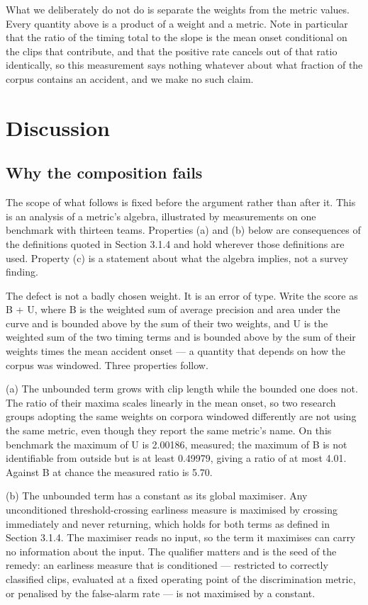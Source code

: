 What we deliberately do not do is separate the weights from the metric values. Every quantity above is a product of a weight and a metric. Note in particular that the ratio of the timing total to the slope is the mean onset conditional on the clips that contribute, and that the positive rate cancels out of that ratio identically, so this measurement says nothing whatever about what fraction of the corpus contains an accident, and we make no such claim.


\section{Discussion}

\subsection{Why the composition fails}

The scope of what follows is fixed before the argument rather than after it. This is an analysis of a metric's algebra, illustrated by measurements on one benchmark with thirteen teams. Properties (a) and (b) below are consequences of the definitions quoted in Section 3.1.4 and hold wherever those definitions are used. Property (c) is a statement about what the algebra implies, not a survey finding.

The defect is not a badly chosen weight. It is an error of type. Write the score as B + U, where B is the weighted sum of average precision and area under the curve and is bounded above by the sum of their two weights, and U is the weighted sum of the two timing terms and is bounded above by the sum of their weights times the mean accident onset --- a quantity that depends on how the corpus was windowed. Three properties follow.

(a) The unbounded term grows with clip length while the bounded one does not. The ratio of their maxima scales linearly in the mean onset, so two research groups adopting the same weights on corpora windowed differently are not using the same metric, even though they report the same metric's name. On this benchmark the maximum of U is 2.00186, measured; the maximum of B is not identifiable from outside but is at least 0.49979, giving a ratio of at most 4.01. Against B at chance the measured ratio is 5.70.

(b) The unbounded term has a constant as its global maximiser. Any unconditioned threshold-crossing earliness measure is maximised by crossing immediately and never returning, which holds for both terms as defined in Section 3.1.4. The maximiser reads no input, so the term it maximises can carry no information about the input. The qualifier matters and is the seed of the remedy: an earliness measure that is conditioned --- restricted to correctly classified clips, evaluated at a fixed operating point of the discrimination metric, or penalised by the false-alarm rate --- is not maximised by a constant.

